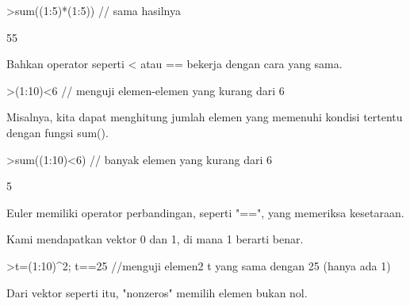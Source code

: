 \documentclass[a4paper,10pt]{article}
\begin{document}
\begin{eulernotebook}
\begin{eulercomment}
\begin{eulercomment}
\begin{eulercomment}
\begin{eulercomment}
\begin{eulerprompt}
>sum((1:5)*(1:5)) // sama hasilnya
\end{eulerprompt}
\begin{euleroutput}
  55
\end{euleroutput}
\begin{eulercomment}
Bahkan operator seperti \textless{} atau == bekerja dengan cara yang sama.
\end{eulercomment}
\begin{eulerprompt}
>(1:10)<6 // menguji elemen-elemen yang kurang dari 6
\end{eulerprompt}
\begin{euleroutput}
  [1,  1,  1,  1,  1,  0,  0,  0,  0,  0]
\end{euleroutput}
\begin{eulercomment}
Misalnya, kita dapat menghitung jumlah elemen yang memenuhi kondisi
tertentu dengan fungsi sum().
\end{eulercomment}
\begin{eulerprompt}
>sum((1:10)<6) // banyak elemen yang kurang dari 6
\end{eulerprompt}
\begin{euleroutput}
  5
\end{euleroutput}
\begin{eulercomment}
Euler memiliki operator perbandingan, seperti "==", yang memeriksa
kesetaraan.

Kami mendapatkan vektor 0 dan 1, di mana 1 berarti benar.
\end{eulercomment}
\begin{eulerprompt}
>t=(1:10)^2; t==25 //menguji elemen2 t yang sama dengan 25 (hanya ada 1)
\end{eulerprompt}
\begin{euleroutput}
  [0,  0,  0,  0,  1,  0,  0,  0,  0,  0]
\end{euleroutput}
\begin{eulercomment}
Dari vektor seperti itu, "nonzeros" memilih elemen bukan nol.


\end{eulercomment}
\end{eulercomment}
\end{eulercomment}
\end{eulercomment}
\end{eulercomment}
\end{eulernotebook}
\end{document}
